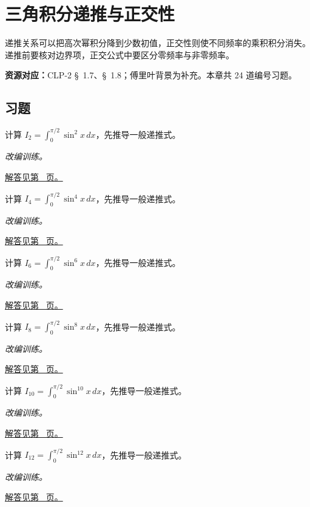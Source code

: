 \documentclass[UTF8,12pt,a4paper,fontset=fandol]{ctexart}
\begin{document}
\clearpage
\section{三角积分递推与正交性}\label{sec:ch16}
递推关系可以把高次幂积分降到少数初值，正交性则使不同频率的乘积积分消失。递推前要核对边界项，正交公式中要区分零频率与非零频率。

\textbf{资源对应：}CLP-2 \S~1.7、\S~1.8；傅里叶背景为补充。本章共 24 道编号习题。
\subsection{习题}
\begin{example}[正弦偶次幂的递推]\label{ex:c16q1}
计算 $I_{2}=\int_0^{\pi/2}\sin^{2}x\,dx$，先推导一般递推式。
\par\textit{改编训练。}\par\hyperref[ans:c16q1]{解答见第~\pageref{ans:c16q1} 页。}
\end{example}
\begin{example}[正弦偶次幂的递推]\label{ex:c16q2}
计算 $I_{4}=\int_0^{\pi/2}\sin^{4}x\,dx$，先推导一般递推式。
\par\textit{改编训练。}\par\hyperref[ans:c16q2]{解答见第~\pageref{ans:c16q2} 页。}
\end{example}
\begin{example}[正弦偶次幂的递推]\label{ex:c16q3}
计算 $I_{6}=\int_0^{\pi/2}\sin^{6}x\,dx$，先推导一般递推式。
\par\textit{改编训练。}\par\hyperref[ans:c16q3]{解答见第~\pageref{ans:c16q3} 页。}
\end{example}
\begin{example}[正弦偶次幂的递推]\label{ex:c16q4}
计算 $I_{8}=\int_0^{\pi/2}\sin^{8}x\,dx$，先推导一般递推式。
\par\textit{改编训练。}\par\hyperref[ans:c16q4]{解答见第~\pageref{ans:c16q4} 页。}
\end{example}
\begin{example}[正弦偶次幂的递推]\label{ex:c16q5}
计算 $I_{10}=\int_0^{\pi/2}\sin^{10}x\,dx$，先推导一般递推式。
\par\textit{改编训练。}\par\hyperref[ans:c16q5]{解答见第~\pageref{ans:c16q5} 页。}
\end{example}
\begin{example}[正弦偶次幂的递推]\label{ex:c16q6}
计算 $I_{12}=\int_0^{\pi/2}\sin^{12}x\,dx$，先推导一般递推式。
\par\textit{改编训练。}\par\hyperref[ans:c16q6]{解答见第~\pageref{ans:c16q6} 页。}
\end{example}
\end{document}
